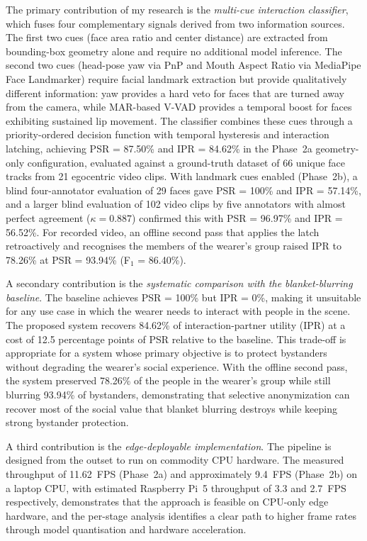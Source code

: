 The primary contribution of my research is the \emph{multi-cue interaction
classifier}, which fuses four complementary signals derived from two information
sources. The first two cues (face area ratio and center distance) are extracted
from bounding-box geometry alone and require no additional model inference. The
second two cues (head-pose yaw via PnP and Mouth Aspect Ratio via MediaPipe Face
Landmarker) require facial landmark extraction but provide qualitatively different
information: yaw provides a hard veto for faces that are turned away from the
camera, while MAR-based V-VAD provides a temporal boost for faces exhibiting
sustained lip movement. The classifier combines these cues through a priority-ordered
decision function with temporal hysteresis and interaction latching, achieving PSR
= 87.50\% and IPR = 84.62\% in the Phase~2a geometry-only configuration, evaluated
against a ground-truth dataset of 66 unique face tracks from 21 egocentric video clips.
With landmark cues enabled (Phase~2b), a blind four-annotator evaluation of 29 faces
gave PSR = 100\% and IPR = 57.14\%, and a larger blind evaluation of 102 video
clips by five annotators with almost perfect agreement ($\kappa = 0.887$) confirmed this
with PSR = 96.97\% and IPR = 56.52\%. For recorded video, an offline second pass
that applies the latch retroactively and recognises the members of the wearer's
group raised IPR to 78.26\% at PSR = 93.94\% (F$_1$ = 86.40\%).

A secondary contribution is the \emph{systematic comparison with the blanket-blurring
baseline}. The baseline achieves PSR = 100\% but IPR = 0\%, making it unsuitable for
any use case in which the wearer needs to interact with people in the scene. The
proposed system recovers 84.62\% of interaction-partner utility (IPR) at a cost of
12.5 percentage points of PSR relative to the baseline. This trade-off is
appropriate for a system whose primary objective is to protect bystanders without
degrading the wearer's social experience. With the offline second pass, the
system preserved 78.26\% of the people in the wearer's group while still blurring
93.94\% of bystanders, demonstrating that selective anonymization can recover most
of the social value that blanket blurring destroys while keeping strong bystander
protection.

A third contribution is the \emph{edge-deployable implementation}. The pipeline is
designed from the outset to run on commodity CPU hardware. The measured throughput
of 11.62~FPS (Phase~2a) and approximately 9.4~FPS (Phase~2b) on a laptop CPU, with
estimated Raspberry Pi~5 throughput of 3.3 and 2.7~FPS respectively,
demonstrates that the approach is feasible on CPU-only edge hardware, and the
per-stage analysis identifies a clear path to higher frame rates through model
quantisation and hardware acceleration.

